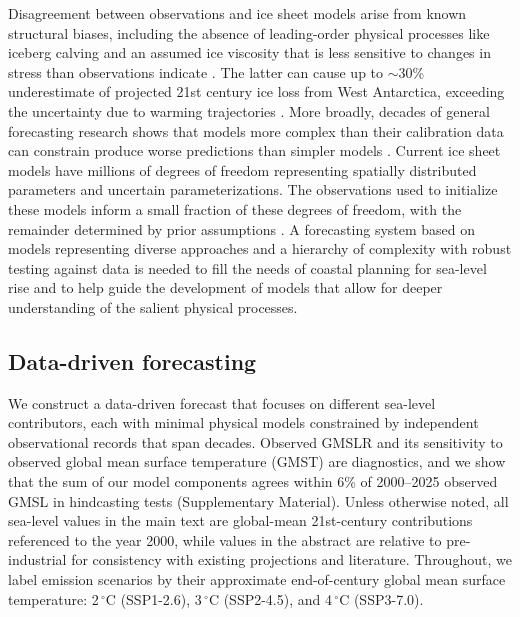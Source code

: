 \documentclass[12pt]{article}
\begin{document}
Disagreement between observations and ice sheet models arise from known structural biases, including the absence of leading-order physical processes like iceberg calving \citep{Fricker2025} and an assumed ice viscosity that is less sensitive to changes in stress than observations indicate \citep{Millstein2022}. The latter can cause up to $\sim$30\% underestimate of projected 21st century ice loss from West Antarctica, exceeding the uncertainty due to warming trajectories \citep{GetraerMorlighem2025}. More broadly, decades of general forecasting research shows that models more complex than their calibration data can constrain produce worse predictions than simpler models \citep{Green2015}. Current ice sheet models have millions of degrees of freedom representing spatially distributed parameters and uncertain parameterizations. The observations used to initialize these models inform a small fraction of these degrees of freedom, with the remainder determined by prior assumptions \citep{Isaac2015, Petra2014}. A forecasting system based on models representing diverse approaches and a hierarchy of complexity with robust testing against data is needed to fill the needs of coastal planning for sea-level rise and to help guide the development of models that allow for deeper understanding of the salient physical processes.

\subsection*{Data-driven forecasting}

We construct a data-driven forecast that focuses on different sea-level contributors, each with minimal physical models constrained by independent observational records that span decades. Observed GMSLR and its sensitivity to observed global mean surface temperature (GMST) are diagnostics, and we show that the sum of our model components agrees within 6\% of 2000--2025 observed GMSL in hindcasting tests (Supplementary Material). Unless otherwise noted, all sea-level values in the main text are global-mean 21st-century contributions referenced to the year 2000, while values in the abstract are relative to pre-industrial for consistency with existing projections and literature. Throughout, we label emission scenarios by their approximate end-of-century global mean surface temperature: 2$\,^\circ$C (SSP1-2.6), 3$\,^\circ$C (SSP2-4.5), and 4$\,^\circ$C (SSP3-7.0).
\end{document}
